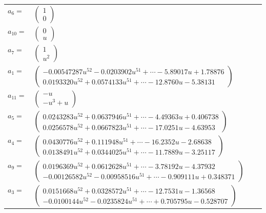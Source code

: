 \documentclass[1p]{elsarticle_modified}
\theoremstyle{definition}
\begin{document}
\begin{tabular}{m{7pt} m{180pt} m{7pt} m{180pt} }
\flushright $a_{6}=$&$\begin{pmatrix}1\\0\end{pmatrix}$ \\
\flushright $a_{10}=$&$\begin{pmatrix}0\\u\end{pmatrix}$ \\
\flushright $a_{7}=$&$\begin{pmatrix}1\\u^2\end{pmatrix}$ \\
\flushright $a_{1}=$&$\begin{pmatrix}-0.00547287 u^{52}-0.0203902 u^{51}+\cdots-5.89017 u+1.78876\\0.0193320 u^{52}+0.0574133 u^{51}+\cdots-12.8760 u-5.38131\end{pmatrix}$ \\
\flushright $a_{11}=$&$\begin{pmatrix}- u\\- u^3+u\end{pmatrix}$ \\
\flushright $a_{5}=$&$\begin{pmatrix}0.0243283 u^{52}+0.0637946 u^{51}+\cdots-4.49363 u+0.406738\\0.0256578 u^{52}+0.0667823 u^{51}+\cdots-17.0251 u-4.63953\end{pmatrix}$ \\
\flushright $a_{4}=$&$\begin{pmatrix}0.0430776 u^{52}+0.111948 u^{51}+\cdots-16.2352 u-2.68638\\0.0138491 u^{52}+0.0344025 u^{51}+\cdots-11.7889 u-3.25117\end{pmatrix}$ \\
\flushright $a_{9}=$&$\begin{pmatrix}0.0196369 u^{52}+0.0612628 u^{51}+\cdots-3.78192 u-4.37932\\-0.00126582 u^{52}-0.00958516 u^{51}+\cdots-0.909111 u+0.348371\end{pmatrix}$ \\
\flushright $a_{3}=$&$\begin{pmatrix}0.0151668 u^{52}+0.0328572 u^{51}+\cdots-12.7531 u-1.36568\\-0.0100144 u^{52}-0.0235824 u^{51}+\cdots+0.705795 u-0.528707\end{pmatrix}$ \\

\end{tabular}
\end{document}
